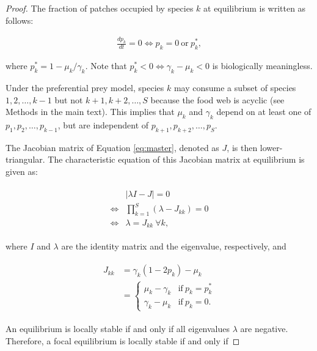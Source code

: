 \documentclass[11pt, class=article, crop=false]{standalone}
\theoremstyle{definition}
\begin{document}
\begin{proof}
The fraction of patches occupied by species $k$ at equilibrium is written as follows:

\begin{align}
    \frac{dp_k}{dt} = 0 \Leftrightarrow p_k = 
         0 ~\text{or}~
         p_{k}^{*},
\end{align}

where $p_{k}^{*} = 1 - \mu_k / \gamma_k$.
Note that $p_{k}^{*} <0 \Leftrightarrow \gamma_k-\mu_k<0$ is biologically meaningless.

Under the preferential prey model, species $k$ may consume a subset of species $1,2,\ldots, k-1$ but not $k+1, k+2, \ldots, S$ because the food web is acyclic (see Methods in the main text).
This implies that $\mu_k$ and $\gamma_k$ depend on at least one of $p_1, p_2, \ldots, p_{k-1}$, but are independent of $p_{k+1}, p_{k+2}, \ldots, p_{S}$.

The Jacobian matrix of Equation \ref{eq:master}, denoted as $J$, is then lower-triangular.
The characteristic equation of this Jacobian matrix at equilibrium is given as:

\begin{align}
    \begin{split}
        &|\lambda I - J| = 0\\
        \Leftrightarrow 
        &\prod_{k=1}^{S}(\lambda -J_{kk})=0\\
        \Leftrightarrow
        &\lambda = J_{kk}~ \forall k,
    \end{split}
\end{align}

where $I$ and $\lambda$ are the identity matrix and the eigenvalue, respectively, and 

\begin{align}
    \begin{split}
        J_{kk}  &= \gamma_k(1-2p_k)-\mu_k \\
                &=\left\{
                       \begin{array}{cl}
                       \mu_k - \gamma_k& \text{if}~ p_k=p_k^*\\
                       \gamma_k - \mu_k& \text{if}~ p_k=0.
                       \end{array}
                   \right.
    \end{split}
\end{align}

An equilibrium is locally stable if and only if all eigenvalues $\lambda$ are negative. Therefore, a focal equilibrium is locally stable if and only if


\end{proof}
\end{document}

